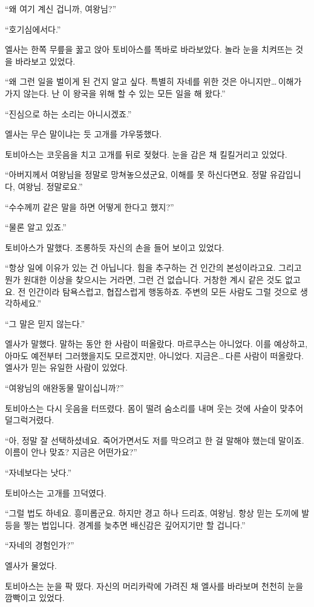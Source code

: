 ``왜 여기 계신 겁니까, 여왕님?''

``호기심에서다.''

엘사는 한쪽 무릎을 꿇고 앉아 토비아스를 똑바로 바라보았다. 놀라 눈을 치켜뜨는 것을 바라보고 있었다.

``왜 그런 일을 벌이게 된 건지 알고 싶다. 특별히 자네를 위한 것은 아니지만\ldots\,이해가 가지 않는다. 난 이 왕국을 위해 할 수 있는 모든 일을 해 왔다.''

``진심으로 하는 소리는 아니시겠죠.''

엘사는 무슨 말이냐는 듯 고개를 갸우뚱했다.

토비아스는 코웃음을 치고 고개를 뒤로 젖혔다. 눈을 감은 채 킬킬거리고 있었다.

``아버지께서 여왕님을 정말로 망쳐놓으셨군요, 이해를 못 하신다면요. 정말 유감입니다, 여왕님. 정말로요.''

``수수께끼 같은 말을 하면 어떻게 한다고 했지?''

``물론 알고 있죠.''

토비아스가 말했다. 조롱하듯 자신의 손을 들어 보이고 있었다.

``항상 일에 이유가 있는 건 아닙니다. 힘을 추구하는 건 인간의 본성이라고요. 그리고 뭔가 원대한 이상을 찾으시는 거라면, 그런 건 없습니다. 거창한 계시 같은 것도 없고요. 전 인간이라 탐욕스럽고, 협잡스럽게 행동하죠. 주변의 모든 사람도 그럴 것으로 생각하세요.''

``그 말은 믿지 않는다.''

엘사가 말했다. 말하는 동안 한 사람이 떠올랐다. 마르쿠스는 아니었다. 이를 예상하고, 아마도 예전부터 그러했을지도 모르겠지만, 아니었다. 지금은\ldots\,다른 사람이 떠올랐다. 엘사가 믿는 유일한 사람이 있었다.

``여왕님의 애완동물 말이십니까?''

토비아스는 다시 웃음을 터뜨렸다. 몸이 떨려 숨소리를 내며 웃는 것에 사슬이 맞추어 덜그럭거렸다.

``아, 정말 잘 선택하셨네요. 죽어가면서도 저를 막으려고 한 걸 말해야 했는데 말이죠. 이름이 안나 맞죠? 지금은 어떤가요?''

``자네보다는 낫다.''

토비아스는 고개를 끄덕였다.

``그럴 법도 하네요. 흥미롭군요. 하지만 경고 하나 드리죠, 여왕님. 항상 믿는 도끼에 발등을 찧는 법입니다. 경계를 늦추면 배신감은 깊어지기만 할 겁니다.''

``자네의 경험인가?''

엘사가 물었다.

토비아스는 눈을 팍 떴다. 자신의 머리카락에 가려진 채 엘사를 바라보며 천천히 눈을 깜빡이고 있었다.

